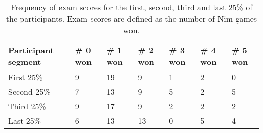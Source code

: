 \begin{table}
	\centering
	\caption[Frequency of exam scores for different participant segments]{Frequency of exam scores for the first, second, third and last 25\% of the
	participants. Exam scores are defined as the number of Nim games won.}
	\label{tab:ax_exam}
	\begin{tabular}{lllllll}\hline
		\textbf{Participant segment} & \textbf{\# 0 won} & \textbf{\# 1 won} & \textbf{\# 2
		won} & \textbf{\# 3 won} & \textbf{\# 4 won} & \textbf{\# 5
		won} \\\hline
		First 25\% & 9 & 19 & 9 & 1 & 2 & 0 \\
		Second 25\% & 7 & 13 & 9 & 5 & 2 & 5 \\ 
		Third 25\% & 9 & 17 & 9 & 2 & 2 & 2 \\ 
		Last 25\% & 6 & 13 & 13 & 0 & 5 & 4 \\ 
	\end{tabular}
\end{table}
